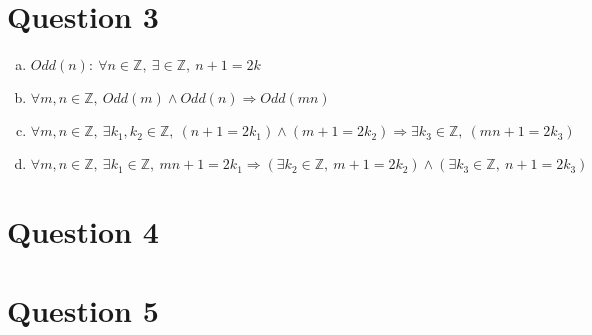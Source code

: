 \documentclass[12pt]{article}
\begin{document}
\section*{Question 3}
\begin{enumerate}[a.]
    \item $Odd(n):\:\forall n \in \mathbb{Z},\:\exists \in \mathbb{Z},\:n+1=2k$
    \item $\forall m,n \in \mathbb{Z},\:Odd(m) \land Odd(n) \Rightarrow Odd(mn)$
    \item $\forall m,n \in \mathbb{Z},\:\exists k_1,k_2 \in \mathbb{Z},\:(n+1=2k_1)
    \land (m+1=2k_2) \Rightarrow \exists k_3 \in \mathbb{Z},\:(mn+1=2k_3)$
    \item $\forall m,n \in \mathbb{Z},\:\exists k_1 \in \mathbb{Z},\: mn + 1 = 2k_1
    \Rightarrow (\exists k_2 \in \mathbb{Z},\:m+1 = 2k_2) \land (\exists k_3 \in \mathbb{Z},\:
    n + 1 = 2k_3)$
\end{enumerate}

\section*{Question 4}

\section*{Question 5}
\end{document}

